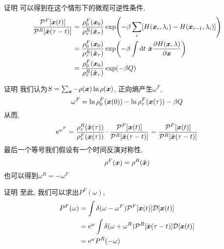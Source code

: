     \begin{frame}{证明}
        可以得到在这个情形下的微观可逆性条件,
        \begin{equation}
            \begin{split}
                \frac{\mathcal{P}^F[\vb*x(t)]}{\mathcal{P}^R[\hat{\vb*x}(\tau-t)]} &= \frac{\rho^F_0(\vb*x_0)}{\rho^R_\tau(\hat{\vb*x}_\tau)}\exp(-\beta\sum_i [H(\vb*x_i,\lambda_i) - H(\vb*x_{i-1},\lambda_i)]) \\
                &= \frac{\rho^F_0(\vb*x_0)}{\rho^R_\tau(\hat{\vb*x}_\tau)}\exp(-\beta\int\dd t\ \dot{\vb*x}\pdv{H(\vb*x,\lambda)}{\vb*x})\\
                &= \frac{\rho^F_0(\vb*x_0)}{\rho^R_\tau(\hat{\vb*x}_\tau)}\exp(-\beta Q)
            \end{split}
        \end{equation}
    \end{frame}
    \begin{frame}{证明}
        我们认为$S = \sum_{\vb*x} - \rho(\vb*x)\ln\rho(\vb*x)$, 
        正向熵产生$\omega^F$, 
        \begin{equation}
            \omega^F = \ln\rho^F_0(\vb*x(0)) - \ln\rho^F_\tau(\vb*x(\tau)) - \beta Q
        \end{equation}
        从而,
        \begin{equation}
            \mathrm{e}^{\omega^F} = \frac{\rho^R_\tau(\hat{\vb*x}(\tau))}{\rho^F_\tau(\vb*x(\tau))}\cdot\frac{\mathcal{P}^F[\vb*x(t)]}{\mathcal{P}^R[\hat{\vb*x}(\tau-t)]} = \frac{\mathcal{P}^F[\vb*x(t)]}{\mathcal{P}^R[\hat{\vb*x}(\tau-t)]}
        \end{equation}
        最后一个等号我们假设有一个时间反演对称性,
        \begin{equation}
            \rho^F(\vb*x) = \rho^R(\hat{\vb*x})
        \end{equation}
        也可以得到$\omega^R = -\omega^F$
    \end{frame}
    \begin{frame}{证明}
        至此, 我们可以求出$P^F(\omega)$,
        \begin{equation}
            \begin{split}
                P^F(\omega) &= \int\delta(\omega-\omega^F) \mathcal P^F[\vb*x(t)]\mathcal D[\vb*x(t)]\\
                &= \mathrm{e}^{\omega}\int\delta(\omega+\omega^R)\mathcal{P}^R[\hat{\vb*x}(\tau-t)]\mathcal D[\vb*x(t)]\\
                &= \mathrm{e}^{\omega}P^R(-\omega)
            \end{split}
        \end{equation}
    \end{frame}
